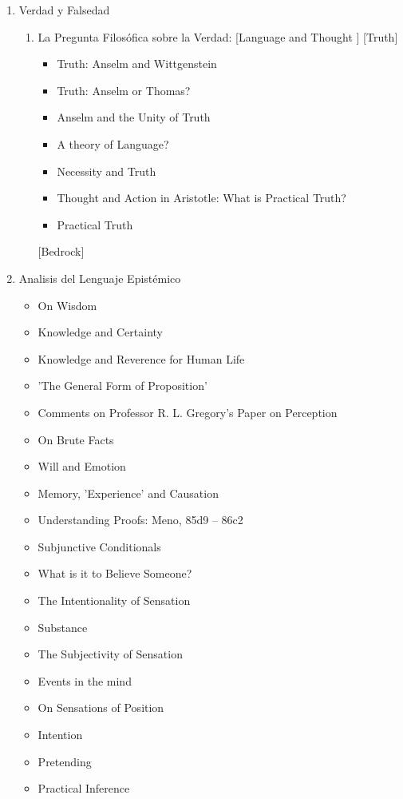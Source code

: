 \documentclass[11pt]{article}
\begin{document}
\begin{enumerate}
\item Verdad y Falsedad
\label{sec-4-1-3-1}
\begin{enumerate}
\item La Pregunta Filosófica sobre la Verdad:
\label{sec-4-1-3-1-1}
[Language and Thought ]
[Truth]
\begin{itemize}
\item Truth: Anselm and Wittgenstein
\item Truth: Anselm or Thomas?
\item Anselm and the Unity of Truth
\item A theory of Language?
\item Necessity and Truth
\item Thought and Action in Aristotle: What is Practical Truth?
\item Practical Truth
\end{itemize}

[Bedrock]
\end{enumerate}

\item Analisis del Lenguaje Epistémico
\label{sec-4-1-3-2}
\begin{itemize}
\item On Wisdom
\item Knowledge and Certainty
\item Knowledge and Reverence for Human Life
\item 'The General Form of Proposition'
\item Comments on Professor R. L. Gregory's Paper on Perception
\item On Brute Facts
\item Will and Emotion
\item Memory, 'Experience' and Causation
\item Understanding Proofs: Meno, 85d9 – 86c2
\item Subjunctive Conditionals
\item What is it to Believe Someone?
\item The Intentionality of Sensation
\item Substance
\item The Subjectivity of Sensation
\item Events in the mind
\item On Sensations of Position
\item Intention
\item Pretending
\item Practical Inference
\end{itemize}


\end{enumerate}
\end{document}
